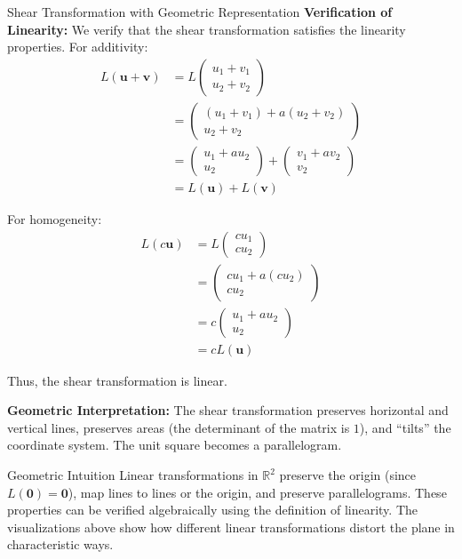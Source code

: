 \documentclass[12pt,a4paper]{article}
\newcommand{\R}{\mathbb{R}}
\newcommand{\vv}[1]{\mathbf{#1}}
\newcommand{\vzero}{\mathbf{0}}
\begin{document}
\begin{example}{Shear Transformation with Geometric Representation}
		\textbf{Verification of Linearity:} We verify that the shear transformation satisfies the linearity properties. For additivity:
		\begin{align*}
			L(\vv{u} + \vv{v}) &= L\begin{pmatrix} u_1 + v_1 \\ u_2 + v_2 \end{pmatrix} \\
			&= \begin{pmatrix} (u_1 + v_1) + a(u_2 + v_2) \\ u_2 + v_2 \end{pmatrix} \\
			&= \begin{pmatrix} u_1 + au_2 \\ u_2 \end{pmatrix} + \begin{pmatrix} v_1 + av_2 \\ v_2 \end{pmatrix} \\
			&= L(\vv{u}) + L(\vv{v})
		\end{align*}
		
		For homogeneity:
		\begin{align*}
			L(c\vv{u}) &= L\begin{pmatrix} cu_1 \\ cu_2 \end{pmatrix} \\
			&= \begin{pmatrix} cu_1 + a(cu_2) \\ cu_2 \end{pmatrix} \\
			&= c\begin{pmatrix} u_1 + au_2 \\ u_2 \end{pmatrix} \\
			&= cL(\vv{u})
		\end{align*}
		
		Thus, the shear transformation is linear.
		
		\textbf{Geometric Interpretation:} The shear transformation preserves horizontal and vertical lines, preserves areas (the determinant of the matrix is $1$), and ``tilts'' the coordinate system. The unit square becomes a parallelogram.
	\end{example}
	
	\begin{remark}{Geometric Intuition}
		Linear transformations in $\R^2$ preserve the origin (since $L(\vzero) = \vzero$), map lines to lines or the origin, and preserve parallelograms. These properties can be verified algebraically using the definition of linearity. The visualizations above show how different linear transformations distort the plane in characteristic ways.
	\end{remark}
	
\end{document}
